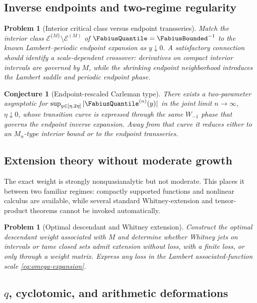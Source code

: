 \documentclass[11pt,a4paper]{article}
\newtheorem{conjecture}[theorem]{Conjecture}
\newtheorem{problem}[theorem]{Problem}
\theoremstyle{definition}
\theoremstyle{remark}
\newcommand{\Roumieu}[1]{\mathcal{E}^{\{#1\}}}
\newcommand{\Beurling}[1]{\mathcal{E}^{(#1)}}
\begin{document}
\subsection{Inverse endpoints and two-regime regularity}

\begin{problem}[Interior critical class versus endpoint transseries]
Match the interior class $\Roumieu{M}\setminus\Beurling{M}$ of
$\FabiusQuantile=\FabiusBounded^{-1}$ to the
known Lambert--periodic endpoint expansion as $y\downarrow0$.  A satisfactory
connection should identify a scale-dependent crossover: derivatives on compact
interior intervals are governed by $M$, while the shrinking endpoint neighborhood
introduces the Lambert saddle and periodic endpoint phase.
\end{problem}

\begin{conjecture}[Endpoint-rescaled Carleman type]
There exists a two-parameter asymptotic for
$\sup_{y\in[\eta,2\eta]}|\FabiusQuantile^{(n)}(y)|$ in the joint limit $n\to\infty$,
$\eta\downarrow0$, whose transition curve is expressed through the same
$W_{-1}$ phase that governs the endpoint inverse expansion.  Away from that curve
it reduces either to an $M_n$-type interior bound or to the endpoint transseries.
\end{conjecture}

\subsection{Extension theory without moderate growth}

The exact weight is strongly nonquasianalytic but not moderate.  This places it
between two familiar regimes: compactly supported functions and nonlinear calculus
are available, while several standard Whitney-extension and tensor-product theorems
cannot be invoked automatically.

\begin{problem}[Optimal descendant and Whitney extension]
Construct the optimal descendant weight associated with $M$ and determine whether
Whitney jets on intervals or tame closed sets admit extension without loss, with a
finite loss, or only through a weight matrix.  Express any loss in the Lambert
associated-function scale \eqref{eq:omega-expansion}.
\end{problem}

\subsection{\texorpdfstring{$q$}{q}, cyclotomic, and arithmetic deformations}
\end{document}
